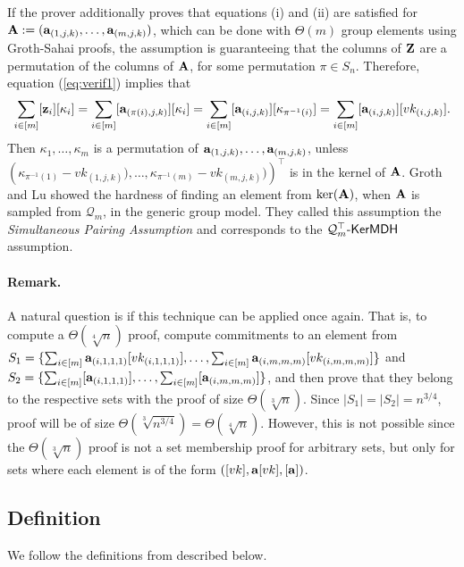 If the prover additionally proves that equations (i) and (ii) are satisfied for $\mathbf{{A}}:=(\mathbf{a}_{(1,j,k)},\ldots,\mathbf{a}_{(m,j,k)})$, which can be done with $\Theta(m)$ group elements using Groth-Sahai proofs, the assumption is guaranteeing that the columns of $\mathbf{{Z}}$ are a permutation of the columns of $\mathbf{{A}}$, for some permutation $\pi\in S_n$. Therefore, equation (\ref{eq:verif1}) implies that
$$
\sum_{i\in[m]}[\mathbf{z}_i][\kappa_i]=\sum_{i\in[m]}[\mathbf{a}_{(\pi(i),j,k)}][\kappa_i]=\sum_{i\in[m]}[\mathbf{a}_{(i,j,k)}][\kappa_{\pi^{-1}(i)}]=\sum_{i\in[m]}[\mathbf{a}_{(i,j,k)}][vk_{(i,j,k)}].
$$
Then $\kappa_1,\ldots,\kappa_m$ is a permutation of $\mathbf{a}_{(1,j,k)},\ldots,\mathbf{a}_{(m,j,k)}$, unless $(\kappa_{\pi^{-1}(1)}-{vk_{(1,j,k)}),\ldots,\kappa_{\pi^{-1}(m)}-vk_{(m,j,k)})})^\top$ is in the kernel of $\mathbf{{A}}$. Groth and Lu showed the hardness of finding an element from $\ker(\mathbf{{A}})$, when $\mathbf{{A}}$ is sampled from $\mathcal{Q}_m$, in the generic group model. They called this assumption the \emph{Simultaneous Pairing Assumption} and corresponds to the $\mathcal{Q}_m^\top\mbox{-}\mathsf{KerMDH}$ assumption.


\paragraph{Remark.}
A natural question is if this technique can be applied once again. That is, to compute a $\Theta(\sqrt[4]{n})$  proof, compute commitments to an element from $S_1=\{\sum_{i\in[m]}\mathbf{a}_{(i,1,1,1)}[vk_{(i,1,1,1)}],\ldots,\sum_{i\in[m]}\mathbf{a}_{(i,m,m,m)}[vk_{(i,m,m,m)}]\}$ and $S_2=\allowbreak\{\sum_{i\in[m]}[\mathbf{a}_{(i,1,1,1)}],\ldots,\sum_{i\in[m]}[\mathbf{a}_{(i,m,m,m)}]\}$, and then prove that they belong to the respective sets with the proof of size $\Theta(\sqrt[3]{n})$. Since $|S_1|=|S_2|=n^{3/4}$, proof will be of size $\Theta(\sqrt[3]{n^{3/4}})=\Theta(\sqrt[4]{n})$. However, this is not possible since the $\Theta(\sqrt[3]{n})$ proof is not a set membership proof for arbitrary sets, but only for sets where each element is of the form $([vk],\mathbf{a}[vk],[\mathbf{a}])$.

\subsection{Definition}
We follow the definitions from \cite{ICALP:ChaGroSah07} described below.

